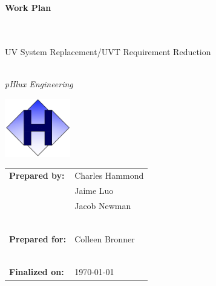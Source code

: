 \documentclass[11pt,letterpaper,final]{report}
\author{Charles Hammond \\ Jaime Luo \\ Jacob Newman}
\begin{document}
\begin{center}

\begin{huge}

\begin{Huge}\textbf{Work Plan} \end{Huge} \\~\\ UV System Replacement/UVT Requirement Reduction \\~\\
\end{huge}

\begin{Large} \textit{pHlux Engineering} \end{Large}



\begin{large}

\vspace{50pt}
\includegraphics[height=1in]{WP}\\
\end{large}

\vspace{100pt}


\begin{tabular}{ll}
    \textbf{Prepared by:}&Charles Hammond\\
                         & Jaime Luo\\
                         & Jacob Newman\\
                         & \\~\\
    \textbf{Prepared for:}& Colleen Bronner\\
                         & \\~\\
    \textbf{Finalized on:}& \today\\ 

\end{tabular}

\end{center}

\end{document}
